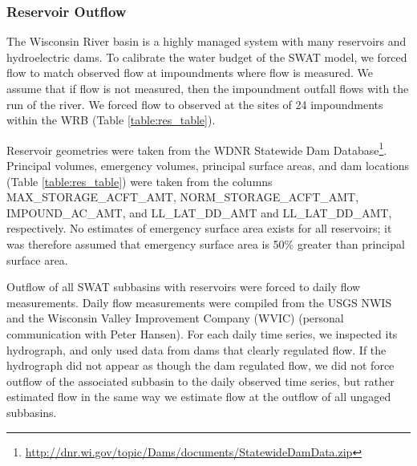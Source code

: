 \subsubsection{Reservoir Outflow}

The Wisconsin River basin is a highly managed system with many reservoirs and hydroelectric dams. To calibrate the water budget of the SWAT model, we forced flow to match observed flow at impoundments where flow is measured. We assume that if flow is not measured, then the impoundment outfall flows with the run of the river. We forced flow to observed at the sites of 24 impoundments within the WRB (Table \ref{table:res_table}).

\begin{landscape}

\end{landscape}

Reservoir geometries were taken from the WDNR Statewide Dam Database\footnote{\url{http://dnr.wi.gov/topic/Dams/documents/StatewideDamData.zip}}. Principal volumes, emergency volumes, principal surface areas, and dam locations (Table \ref{table:res_table}) were taken from the columns MAX\_STORAGE\_ACFT\_AMT, NORM\_STORAGE\_ACFT\_AMT, IMPOUND\_AC\_AMT, and LL\_LAT\_DD\_AMT and LL\_LAT\_DD\_AMT, respectively. No estimates of emergency surface area exists for all reservoirs; it was therefore assumed that emergency surface area is 50\% greater than principal surface area.

Outflow of all SWAT subbasins with reservoirs were forced to daily flow measurements. Daily flow measurements were compiled from the USGS NWIS \citep{usgs_nwis_2014} and the Wisconsin Valley Improvement Company (WVIC) (personal communication with Peter Hansen). For each daily time series, we inspected its hydrograph, and only used data from dams that clearly regulated flow. If the hydrograph did not appear as though the dam regulated flow, we did not force outflow of the associated subbasin to the daily observed time series, but rather estimated flow in the same way we estimate flow at the outflow of all ungaged subbasins. 
